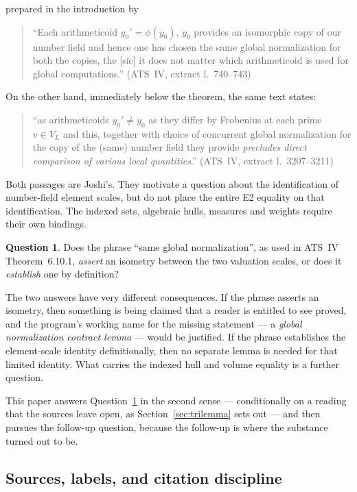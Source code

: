 \documentclass[11pt,a4paper]{article}
\theoremstyle{definition}
\newtheorem{question}{Question}
\theoremstyle{plain}
\theoremstyle{definition}
\newcommand{\anchor}[2]{(#1, extract l.~#2)}
\begin{document}
prepared in the introduction by

\begin{quote}\small
``Each arithmeticoid $y_0' = \phi(y_0)$, $y_0$ provides an isomorphic copy of our
number field and hence one has chosen the same global normalization for both the
copies, the [sic] it does not matter which arithmeticoid is used for global
computations.'' \hfill\anchor{ATS~IV}{740--743}
\end{quote}

On the other hand, immediately below the theorem, the same text states:

\begin{quote}\small
``as arithmeticoids $y_0' \neq y_0$ as they differ by Frobenius at each prime
$v \in V_L$ and this, together with choice of concurrent global normalization for
the copy of the (same) number field they provide \emph{precludes direct comparison
of various local quantities}.'' \hfill\anchor{ATS~IV}{3207--3211}
\end{quote}

Both passages are Joshi's. They motivate a question about the identification
of number-field element scales, but do not place the entire E2 equality on
that identification. The indexed sets, algebraic hulls, measures and weights
require their own bindings.

\begin{question}\label{q:main}
Does the phrase ``same global normalization'', as used in ATS~IV Theorem~6.10.1,
\emph{assert} an isometry between the two valuation scales, or does it
\emph{establish} one by definition?
\end{question}

The two answers have very different consequences. If the phrase asserts an
isometry, then something is being claimed that a reader is entitled to see proved,
and the program's working name for the missing statement --- a \emph{global
normalization contract lemma} --- would be justified. If the phrase establishes
the element-scale identity definitionally, then no separate lemma is needed
for that limited identity. What carries the indexed hull and volume equality
is a further question.

This paper answers Question~\ref{q:main} in the second sense --- conditionally on
a reading that the sources leave open, as Section~\ref{sec:trilemma} sets out ---
and then pursues the follow-up question, because the follow-up is where the
substance turned out to be.

\subsection{Sources, labels, and citation discipline}
\label{sec:sources}
\end{document}
